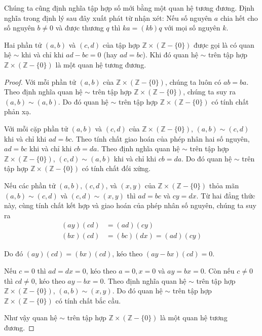 Chúng ta cũng định nghĩa tập hợp số mới bằng một quan hệ tương đương. Định nghĩa trong định lý sau đây xuất phát từ nhận xét: Nếu số nguyên $a$ chia hết cho số nguyên $b\ne 0$ và được thương $q$ thì $k a = (k b) q$ với mọi số nguyên $k$.

\begin{theorem}
	Hai phần tử $(a, b)$ và $(c, d)$ của tập hợp $\mathbb{Z}\times(\mathbb{Z} - \{0\})$ được gọi là có quan hệ $\sim$ khi và chỉ khi $a d - b c = 0$ (hay $a d = b c$). Khi đó quan hệ $\sim$ trên tập hợp $\mathbb{Z}\times(\mathbb{Z} - \{0\})$ là một quan hệ tương đương.
\end{theorem}

\begin{proof}
	Với mỗi phần tử $(a, b)$ của $\mathbb{Z}\times(\mathbb{Z} - \{0\})$, chúng ta luôn có $a b = b a$. Theo định nghĩa quan hệ $\sim$ trên tập hợp $\mathbb{Z}\times(\mathbb{Z} - \{0\})$, chúng ta suy ra $(a, b)\sim (a, b)$. Do đó quan hệ $\sim$ trên tập hợp $\mathbb{Z}\times(\mathbb{Z} - \{0\})$ có tính chất phản xạ.

	Với mỗi cặp phần tử $(a, b)$ và $(c, d)$ của $\mathbb{Z}\times(\mathbb{Z} - \{0\})$, $(a, b)\sim (c, d)$ khi và chỉ khi $a d = b c$. Theo tính chất giao hoán của phép nhân hai số nguyên, $a d = b c$ khi và chỉ khi $c b = d a$.  Theo định nghĩa quan hệ $\sim$ trên tập hợp $\mathbb{Z}\times(\mathbb{Z} - \{0\})$, $(c, d)\sim (a, b)$ khi và chỉ khi $c b = d a$. Do đó quan hệ $\sim$ trên tập hợp $\mathbb{Z}\times(\mathbb{Z} - \{0\})$ có tính chất đối xứng.

	Nếu các phần tử $(a, b), (c, d)$, và $(x, y)$ của $\mathbb{Z}\times(\mathbb{Z} - \{0\})$ thỏa mãn $(a, b)\sim (c, d)$ và $(c, d)\sim (x, y)$ thì $a d = b c$ và $c y = d x$. Từ hai đẳng thức này, cùng tính chất kết hợp và giao hoán của phép nhân số nguyên, chúng ta suy ra
	\begin{align*}
		(a y) (c d) & = (a d) (c y)               \\
		(b x) (c d) & = (b c) (d x) = (a d) (c y)
	\end{align*}

	Do đó $(a y) (c d) = (b x) (c d)$, kéo theo $(a y - b x) (c d) = 0$.

	Nếu $c = 0$ thì $a d = d x = 0$, kéo theo $a = 0, x = 0$ và $a y = b x = 0$. Còn nếu $c\ne 0$ thì $c d\ne 0$, kéo theo $a y - b x = 0$. Theo định nghĩa quan hệ $\sim$ trên tập hợp $\mathbb{Z}\times(\mathbb{Z} - \{0\})$, $(a, b)\sim (x, y)$. Do đó quan hệ $\sim$ trên tập hợp $\mathbb{Z}\times(\mathbb{Z} - \{0\})$ có tính chất bắc cầu.

	Như vậy quan hệ $\sim$ trên tập hợp $\mathbb{Z}\times(\mathbb{Z} - \{0\})$ là một quan hệ tương đương.
\end{proof}

